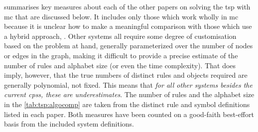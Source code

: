 
 summarises key measures about each of the other papers on solving the \gls{tsp} with \gls{mc} that are discussed below.  It includes only those which work wholly in \gls{mc} because it is unclear how to make a meaningful comparison with those which use a hybrid approach, \eg{} \cite{Nishida2006}.  Other systems all require some degree of customisation based on the problem at hand, generally parameterized over the number of nodes or edges in the graph, making it difficult to provide a precise estimate of the number of rules and alphabet size (or even the time complexity).  That does imply, however, that the true numbers of distinct rules and objects required are generally polynomial, not fixed.  This means that \emph{for all other systems besides the current \glspl{cps}, these are underestimates}.  The number of rules and the alphabet size in the \cref{tab:tsp:algocomp} are taken from the distinct rule and symbol definitions listed in each paper.  Both measures have been counted on a good-faith best-effort basis from the included system definitions.


